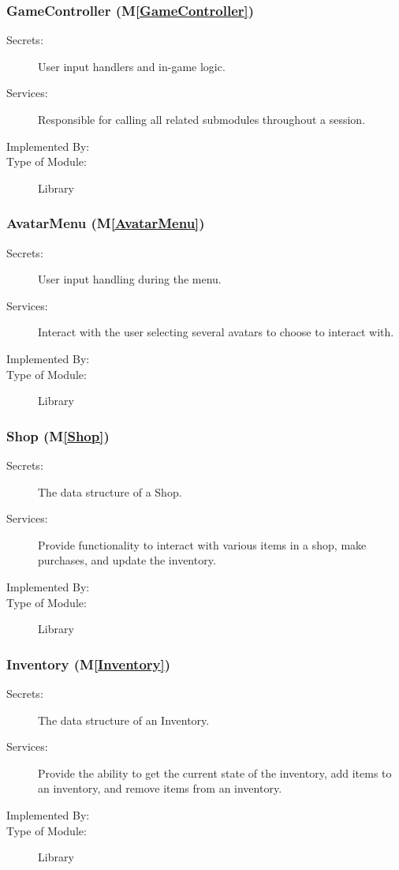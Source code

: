\documentclass[12pt, titlepage]{article}
\newcommand{\mref}[1]{M\ref{#1}}
\begin{document}
\subsubsection{GameController (\mref{GameController})}

\begin{description}
\item[Secrets:] User input handlers and in-game logic.
\item[Services:] Responsible for calling all related submodules throughout a session.
\item[Implemented By:]  \progname
\item[Type of Module:] Library
\end{description}

\subsubsection{AvatarMenu (\mref{AvatarMenu})}

\begin{description}
\item[Secrets:] User input handling during the menu.
\item[Services:] Interact with the user selecting several avatars to choose to interact with.
\item[Implemented By:]  \progname
\item[Type of Module:] Library
\end{description}


\subsubsection{Shop (\mref{Shop})}

\begin{description}
\item[Secrets:] The data structure of a Shop.
\item[Services:] Provide functionality to interact with various items in a shop, make purchases, and update the inventory.
\item[Implemented By:]  \progname
\item[Type of Module:] Library
\end{description}

\subsubsection{Inventory (\mref{Inventory})}

\begin{description}
\item[Secrets:] The data structure of an Inventory.
\item[Services:] Provide the ability to get the current state of the inventory, add items to an inventory, and remove items from an inventory.

\item[Implemented By:]  \progname
\item[Type of Module:] Library
\end{description}
\end{document}
